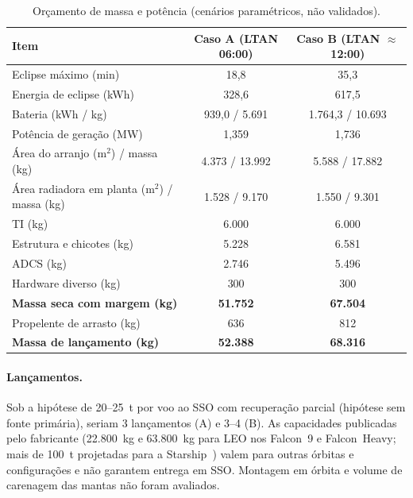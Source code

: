 \documentclass[11pt,a4paper]{article}
\begin{document}
\begin{table}[ht]
\centering
\caption{Orçamento de massa e potência (cenários paramétricos, não validados).}
\label{tab:massa}
\small
\begin{tabular}{@{}lcc@{}}
\toprule
Item & Caso A (LTAN 06:00) & Caso B (LTAN $\approx$ 12:00)\\
\midrule
Eclipse máximo (min)                            & 18,8 & 35,3\\
Energia de eclipse (kWh)                        & 328,6 & 617,5\\
Bateria (kWh / kg)                              & 939,0 / 5.691 & 1.764,3 / 10.693\\
Potência de geração (MW)                        & 1,359 & 1,736\\
Área do arranjo (m$^2$) / massa (kg)            & 4.373 / 13.992 & 5.588 / 17.882\\
Área radiadora em planta (m$^2$) / massa (kg)   & 1.528 / 9.170 & 1.550 / 9.301\\
TI (kg)                                         & 6.000 & 6.000\\
Estrutura e chicotes (kg)                       & 5.228 & 6.581\\
ADCS (kg)                                       & 2.746 & 5.496\\
Hardware diverso (kg)                           & 300 & 300\\
\textbf{Massa seca com margem (kg)}             & \textbf{51.752} & \textbf{67.504}\\
Propelente de arrasto (kg)                      & 636 & 812\\
\textbf{Massa de lançamento (kg)}               & \textbf{52.388} & \textbf{68.316}\\
\bottomrule
\end{tabular}
\end{table}

\paragraph{Lançamentos.} Sob a hipótese de 20--25~t por voo ao SSO com
recuperação parcial (hipótese sem fonte primária), seriam 3 lançamentos (A) e
3--4 (B). As capacidades publicadas pelo fabricante (22.800~kg e 63.800~kg para
LEO nos Falcon~9 e Falcon~Heavy; mais de 100~t projetadas para a
Starship~\cite{r10,r11,r12}) valem para outras órbitas e configurações e não
garantem entrega em SSO. Montagem em órbita e volume de carenagem das mantas não
foram avaliados.
\end{document}
